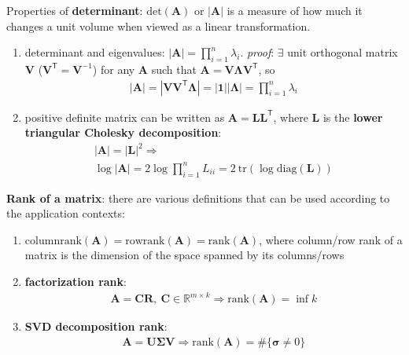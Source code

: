 Properties of \textbf{determinant}: 
$\mathrm{det}(\mathbf{A})$ or $|\mathbf{A}|$ is a measure of how much it changes a unit volume when viewed as a linear transformation.
\begin{enumerate}[{(1)}]
    \item determinant and eigenvalues: $|\mathbf{A}|=\prod_{i=1}^n\lambda_i$. 
    \textit{proof}: 
    $\exists$ unit orthogonal matrix $\mathbf{V}$ ($\mathbf{V}^\mathsf{T}=\mathbf{V}^{-1}$) 
    for any $\mathbf{A}$ 
    such that $\mathbf{A}=\mathbf{V\Lambda V}^\mathsf{T}$,
    so
    \begin{gather}
        |\mathbf{A}|=|\mathbf{VV}^\mathsf{T}\mathbf{\Lambda}|=|\mathbf{1}||\mathbf{\Lambda}|=\prod_{i=1}^n\lambda_i
    \end{gather}
    
    \item positive definite matrix can be written as $\mathbf{A}=\mathbf{LL}^\mathsf{T}$, 
    where $\mathbf{L}$ is the \textbf{lower triangular Cholesky decomposition}:
    \begin{gather}
        |\mathbf{A}|=|\mathbf{L}|^2 \Rightarrow\\
        \log{|\mathbf{A}|}=2\log\prod_{i=1}^n L_{ii}=2~\mathrm{tr}(\log\mathrm{diag}(\mathbf{L}))
    \end{gather}
\end{enumerate}

\textbf{Rank of a matrix}: there are various definitions that can be used according to the application contexts:
\begin{enumerate}[{(1)}]
    \item \uline{$\mathrm{columnrank}(\mathbf{A})=\mathrm{rowrank}(\mathbf{A})=\mathrm{rank}(\mathbf{A})$},
    where column/row rank of a matrix is the dimension of the space spanned by its columns/rows
    
    \item \textbf{factorization rank}:
    \begin{gather}
        \mathbf{A}=\mathbf{CR},~\mathbf{C}\in\mathbb{R}^{m\times{k}}\Rightarrow
        \mathrm{rank}(\mathbf{A})=\inf{k}
    \end{gather}
    
    \item \textbf{SVD decomposition rank}:
    \begin{gather}
        \mathbf{A}=\mathbf{U\Sigma V}\Rightarrow
        \mathrm{rank}(\mathbf{A})=\#\{\bm{\sigma}\neq 0\}
    \end{gather}
\end{enumerate}

